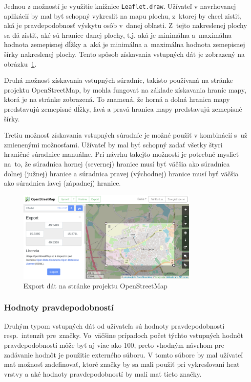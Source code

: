 Jednou z možností je využitie knižnice \texttt{Leaflet.draw}. Užívateľ v navrhovanej aplikácií by mal byť schopný vykresliť na mapu plochu, z~ktorej by chcel zistiť, aká je pravdepodobnosť výskytu osôb v~danej oblasti. Z~tejto nakreslenej plochy sa dá zistiť, aké sú hranice danej plochy, t.j. aká je minimálna a~maximálna hodnota zemepisnej dĺžky a~aká je minimálna a~maximálna hodnota zemepisnej šírky nakreslenej plochy. Tento spôsob získavania vstupných dát je zobrazený na obrázku~\ref{fig:osm-export}.

Druhá možnosť získavania vstupných súradníc, takisto používaná na stránke projektu OpenStreetMap, by mohla fungovať na základe získavania hraníc mapy, ktorá je na stránke zobrazená. To znamená, že horná a dolná hranica mapy predstavujú zemepisné dĺžky, ľavá a pravá hranica mapy predstavujú zemepisné šírky.

Tretiu možnosť získavania vstupných súradníc je možné použiť v kombinácií s~už zmienenými možnosťami. Užívateľ by mal byť schopný zadať všetky štyri hraničné súradnice manuálne. Pri návrhu takejto možnosti je potrebné myslieť na~to, že súradnica hornej (severnej) hranice musí byť väčšia ako súradnica dolnej (južnej) hranice a súradnica pravej (východnej) hranice musí byť väčšia ako súradnica ľavej (západnej) hranice.

\begin{figure}[ht]
    \centering
    \includegraphics[width=0.8\textwidth]{obrazky-figures/openstreetmap-export.png}
    \caption{Export dát na stránke projektu OpenStreetMap}
    \label{fig:osm-export}
\end{figure}
    
\subsubsection{Hodnoty pravdepodobností}
Druhým typom vstupných dát od užívateľa sú hodnoty pravdepodobností resp.~intenzít pre~značky. Vo~väčšine prípadoch počet týchto vstupných hodnôt pravdepodobností môže byť aj viac ako 100, preto vhodným návrhom pre zadávanie hodnôt je použitie externého súboru. V tomto súbore by mal užívateľ mať možnosť zadefinovať, ktoré značky by sa mali použiť pri vykresľovaní heat vrstvy a aké hodnoty pravdepodobností by mali mať tieto značky.

